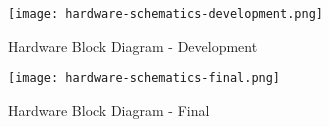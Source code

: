 


\begin{figure}
	\centering
	\texttt{[image: hardware-schematics-development.png]}
	\caption{Hardware Block Diagram - Development}
	\label{fig:hardware_schematic_development}
\end{figure}

\begin{figure}
	\centering
	\texttt{[image: hardware-schematics-final.png]}
	\caption{Hardware Block Diagram - Final}
	\label{fig:hardware_schematic_final}
\end{figure}